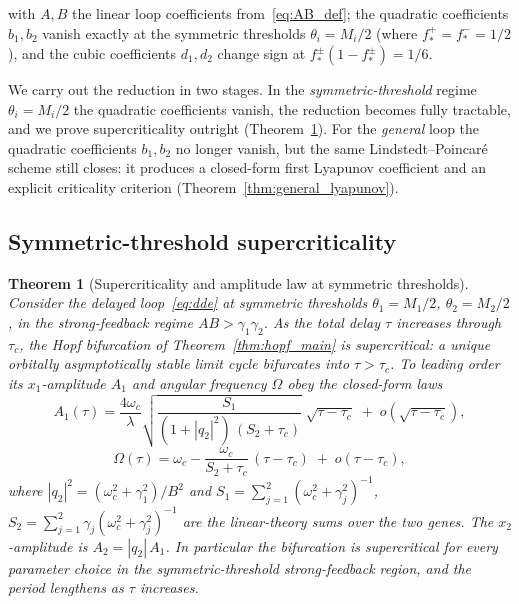 \documentclass[sn-mathphys,Numbered]{sn-jnl}
\theoremstyle{thmstyleone}
\newtheorem{theorem}{Theorem}
\theoremstyle{thmstyletwo}
\theoremstyle{thmstylethree}
\begin{document}
with $A,B$ the linear loop coefficients from~\eqref{eq:AB_def}; the
quadratic coefficients $b_1,b_2$ vanish exactly at the symmetric
thresholds $\theta_i=M_i/2$ (where $f^{+}_*=f^{-}_*=1/2$), and the
cubic coefficients $d_1,d_2$ change sign at
$f^{\pm}_*(1-f^{\pm}_*)=1/6$.

We carry out the reduction in two stages. In the
\emph{symmetric-threshold} regime $\theta_i=M_i/2$ the quadratic
coefficients vanish, the reduction becomes fully tractable, and we prove
supercriticality outright (Theorem~\ref{thm:supercritical}). For the
\emph{general} loop the quadratic coefficients $b_1,b_2$ no longer
vanish, but the same Lindstedt--Poincar\'e scheme still closes: it
produces a closed-form first Lyapunov coefficient and an explicit
criticality criterion (Theorem~\ref{thm:general_lyapunov}).

\subsection{Symmetric-threshold supercriticality}
\label{sec:symmetric_supercrit}

\begin{theorem}[Supercriticality and amplitude law at symmetric thresholds]
\label{thm:supercritical}
Consider the delayed loop~\eqref{eq:dde} at symmetric thresholds
$\theta_1=M_1/2$, $\theta_2=M_2/2$, in the strong-feedback regime
$AB>\gamma_1\gamma_2$. As the total delay $\tau$ increases through
$\tau_c$, the Hopf bifurcation of Theorem~\ref{thm:hopf_main} is
\emph{supercritical}: a unique orbitally asymptotically stable limit
cycle bifurcates into $\tau>\tau_c$. To leading order its $x_1$-amplitude
$A_1$ and angular frequency $\Omega$ obey the closed-form laws
\begin{equation}
A_1(\tau)=\frac{4\omega_c}{\lambda}
\sqrt{\frac{S_1}{(1+|q_2|^{2})\,(S_2+\tau_c)}}\;\sqrt{\tau-\tau_c}
\;+\;o\!\left(\sqrt{\tau-\tau_c}\right),
\label{eq:amplitude_law}
\end{equation}
\begin{equation}
\Omega(\tau)=\omega_c-\frac{\omega_c}{S_2+\tau_c}\,(\tau-\tau_c)
\;+\;o(\tau-\tau_c),
\label{eq:frequency_law}
\end{equation}
where $|q_2|^{2}=(\omega_c^{2}+\gamma_1^{2})/B^{2}$ and
$S_1=\sum_{j=1}^{2}(\omega_c^{2}+\gamma_j^{2})^{-1}$,
$S_2=\sum_{j=1}^{2}\gamma_j(\omega_c^{2}+\gamma_j^{2})^{-1}$ are the
linear-theory sums over the two genes. The $x_2$-amplitude is
$A_2=|q_2|\,A_1$. In particular the bifurcation is supercritical for
\emph{every} parameter choice in the symmetric-threshold strong-feedback
region, and the period lengthens as $\tau$ increases.
\end{theorem}
\end{document}
